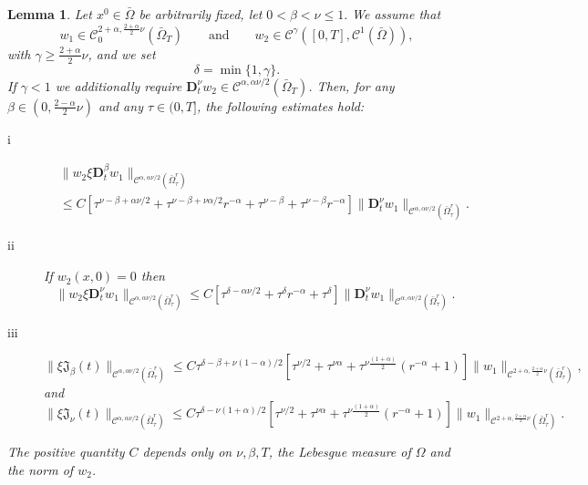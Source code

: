 \documentclass[reqno]{amsart}
\def\C {\mathcal{C}}
\newtheorem{lemma}[proposition]{Lemma}
\theoremstyle{definition}
\numberwithin{equation}{section}
\begin{document}
\begin{lemma}\label{l4.1}
Let $x^{0}\in\bar{\Omega}$ be arbitrarily fixed,
let $0<\beta<\nu\leq 1.$
We assume that
$$w_1\in\C_{0}^{2+\alpha,\frac{2+\alpha}{2}\nu}(\bar{\Omega}_{T})
\qquad\text{and}\qquad w_2\in\C^{\gamma}([0,T],\C^{1}(\bar{\Omega})),$$
with $\gamma\geq\frac{2+\alpha}{2}\nu$, and we set
$$\delta=\min\{1,\gamma\}.$$
If $\gamma<1$ we additionally  require  $\mathbf{D}_{t}^{\nu}w_2\in\C^{\alpha,\alpha\nu/2}(\bar{\Omega}_{T})$.
Then, for
any $\beta\in(0,\frac{2-\alpha}{2}\nu)$ and any $\tau\in(0,T]$, the following estimates hold:
\begin{description}
	\item[i]
\begin{align*}
	&\|w_2\xi \mathbf{D}_{t}^{\beta}w_1\|_{\C^{\alpha,\alpha\nu/2}(\bar{\Omega}^{r}_{\tau})}\\
	&\leq C[\tau^{\nu-\beta+\alpha\nu/2}+\tau^{\nu-\beta+\nu\alpha/2}r^{-\alpha}+\tau^{\nu-\beta}+\tau^{\nu-\beta}r^{-\alpha}]\|\mathbf{D}_{t}^{\nu}w_1\|_{\C^{\alpha,\alpha\nu/2}(\bar{\Omega}^{r}_{\tau})}.
\end{align*}
		\item[ii] If $w_2(x,0)=0$ then
		\[
		\|w_2\xi \mathbf{D}_{t}^{\nu}w_1\|_{\C^{\alpha,\alpha\nu/2}(\bar{\Omega}^{r}_{\tau})}\leq C[\tau^{\delta-\alpha\nu/2}+\tau^{\delta}r^{-\alpha}+\tau^{\delta}]\|\mathbf{D}_{t}^{\nu}w_1\|_{\C^{\alpha,\alpha\nu/2}(\bar{\Omega}^{r}_{\tau})}.
		\]
		\item[iii]
		\[
		\|\xi\mathfrak{J}_{\beta}(t)\|_{\C^{\alpha,\alpha\nu/2}(\bar{\Omega}^{r}_{\tau})}\leq C
		\tau^{\delta-\beta+\nu(1-\alpha)/2}[\tau^{\nu/2}+\tau^{\nu\alpha}+\tau^{\nu\frac{(1+\alpha)}{2}}(r^{-\alpha}+1)]
		\|w_1\|_{\C^{2+\alpha,\frac{2+\alpha}{2}\nu}(\bar{\Omega}^{r}_{\tau})},
		\]
		and
				\[
		\|\xi\mathfrak{J}_{\nu}(t)\|_{\C^{\alpha,\alpha\nu/2}(\bar{\Omega}^{r}_{\tau})}\leq C
\tau^{\delta-\nu(1+\alpha)/2}[\tau^{\nu/2}+\tau^{\nu\alpha}+\tau^{\nu\frac{(1+\alpha)}{2}}(r^{-\alpha}+1)]
		\|w_1\|_{\C^{2+\alpha,\frac{2+\alpha}{2}\nu}(\bar{\Omega}^{r}_{\tau})}.
		\]
		\end{description}
			
The positive quantity $C$ depends only on $\nu,\beta,T$,  the Lebesgue measure of $\Omega$ and the norm of $w_2$.
\end{lemma}
\end{document}
